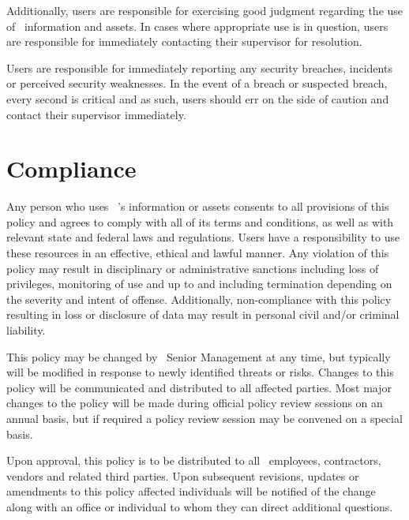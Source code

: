\documentclass[use]{policy}
\begin{document}
		Additionally, users are responsible for exercising good judgment regarding the use of \theOrganization\  information and assets.  In cases where appropriate use is in question, users are responsible for immediately contacting their supervisor for resolution.
	
		Users are responsible for immediately reporting any security breaches, incidents or perceived security weaknesses.  In the event of a breach or suspected breach, every second is critical and as such, users should err on the side of caution and contact their supervisor immediately.  

	
	\section{Compliance}

		Any person who uses \theOrganization\ ’s information or assets consents to all provisions of this policy and agrees to comply with all of its terms and conditions, as well as with relevant state and federal laws and regulations.  Users have a responsibility to use these resources in an effective, ethical and lawful manner.  Any violation of this policy may result in disciplinary or administrative sanctions including loss of privileges, monitoring of use and up to and including termination depending on the severity and intent of offense.  Additionally, non-compliance with this policy resulting in loss or disclosure of data may result in personal civil and/or criminal liability.

	
		This policy may be changed by \theOrganization\  Senior Management at any time, but typically will be modified in response to newly identified threats or risks.  Changes to this policy will be communicated and distributed to all affected parties.  Most major changes to the policy will be made during official policy review sessions on an annual basis, but if required a policy review session may be convened on a special basis.
	
	
		Upon approval, this policy is to be distributed to all \theOrganization\  employees, contractors, vendors and related third parties.  Upon subsequent revisions, updates or amendments to this policy affected individuals will be notified of the change along with an office or individual to whom they can direct additional questions.
	
	
\end{document}
